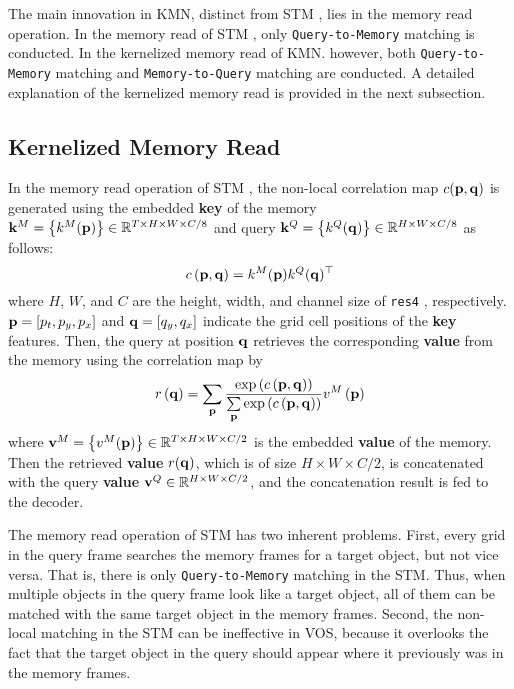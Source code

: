 The main innovation in KMN, distinct from STM \cite{Oh_2019_ICCV}, lies in the memory read operation. In the memory read of STM \cite{Oh_2019_ICCV}, only \texttt{Query-to-Memory} matching is conducted. In the kernelized memory read of KMN. however, both \texttt{Query-to-Memory} matching and \texttt{Memory-to-Query} matching are conducted. A detailed explanation of the kernelized memory read is provided in the next subsection.

\subsection{Kernelized Memory Read}
\label{s32}
In the memory read operation of STM \cite{Oh_2019_ICCV}, the non-local correlation map $c ( {\bf{p}} , {\bf{q}} )$ is generated using the embedded \textbf{key} of the memory ${{\bf{k}}^{M}} = \left\{ {{{k}}^{M}} ( {\bf{p}} ) \right\} \in {\mathbb{R}^{T \times H \times W \times C/8}}$ and query ${{\bf{k}}^{Q}} = \left\{ {{{k}}^{Q}} ( {\bf{q}} ) \right\} \in {\mathbb{R}^{H \times W \times C/8}}$ as follows:
\begin{equation}
c \left( {\bf{p}} , {\bf{q}} \right) = {{{{k}}^{M}}({\bf{p}})} {k^Q}({\bf{q}})^\top
\label{eq1}
\end{equation}
where $H$, $W$, and $C$ are the height, width, and channel size of \texttt{res4} \cite{b23}, respectively. ${\bf{p}} = \left[ p_t, p_y, p_x \right]$ and ${\bf{q}} = \left[ q_y , q_x \right]$ indicate the grid cell positions of the \textbf{key} features. Then, the query at position ${\bf{q}}$ retrieves the corresponding \textbf{value} from the memory using the correlation map by
\begin{equation}
r\left( {\bf{q}} \right) = \sum\limits_{\bf{p}} {\frac{{\exp \left( {c\left( {{\bf{p}},{\bf{q}}} \right)} \right)}}{{\sum\limits_{\bf{p}} {\exp } \left( {c\left( {{\bf{p}},{\bf{q}}} \right)} \right)}}} {v^M}\left( {\bf{p}} \right)
\label{eq2}
\end{equation}
where ${{\bf{v}}^{M}} = \left\{ {{{v}}^{M}} ( {\bf{p}} ) \right\} \in {\mathbb{R}^{T \times H \times W \times C/2}}$ is the embedded \textbf{value} of the memory. Then the retrieved \textbf{value} ${r}({\bf{q}})$, which is of size ${H \times W \times C/2}$, is concatenated with the query \textbf{value} ${{\bf{v}}^{Q}}\in {\mathbb{R}^{H \times W \times C/2}}$, and the concatenation result is fed to the decoder.

The memory read operation of STM \cite{Oh_2019_ICCV} has two inherent problems. First, every grid in the query frame searches the memory frames for a target object, but not vice versa. That is, there is only \texttt{Query-to-Memory} matching in the STM. Thus, when multiple objects in the query frame look like a target object, all of them can be matched with the same target object in the memory frames. Second, the non-local matching in the STM can be ineffective in VOS, because it overlooks the fact that the target object in the query should appear where it previously was in the memory frames.

